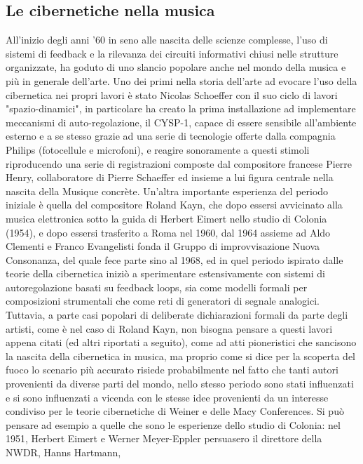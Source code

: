 \clearpage

\subsection{Le cibernetiche nella musica}
\label{sec:Le cibernetiche nella musica}
All'inizio degli anni '60 in seno alle nascita delle scienze complesse,
l'uso di sistemi di feedback e la rilevanza dei circuiti informativi chiusi
nelle strutture organizzate,
ha goduto di uno slancio popolare anche nel mondo della musica e più in generale dell'arte.
Uno dei primi nella storia dell'arte ad evocare l'uso della cibernetica nei propri lavori è stato
Nicolas Schoeffer con il suo ciclo di lavori "spazio-dinamici", in particolare ha creato
la prima installazione ad implementare meccanismi di auto-regolazione, il CYSP-1,
capace di essere sensibile all'ambiente esterno e a se stesso
grazie ad una serie di tecnologie offerte dalla compagnia Philips (fotocellule e microfoni),
e reagire sonoramente a questi stimoli riproducendo
una serie di registrazioni composte dal compositore francese Pierre Henry,
collaboratore di Pierre Schaeffer ed insieme a lui figura centrale nella nascita della Musique concrète.
Un'altra importante esperienza del periodo iniziale è quella del compositore Roland Kayn,
che dopo essersi avvicinato alla musica elettronica sotto la guida di Herbert Eimert
nello studio di Colonia (1954),
e dopo essersi trasferito a Roma nel 1960, dal 1964 assieme ad Aldo Clementi e Franco Evangelisti
fonda il Gruppo di improvvisazione Nuova Consonanza, del quale fece parte sino al 1968,
ed in quel periodo ispirato dalle teorie della cibernetica iniziò a sperimentare
estensivamente con sistemi di autoregolazione basati su feedback loops,
sia come modelli formali per composizioni strumentali che come reti di generatori di segnale analogici.
Tuttavia, a parte casi popolari di deliberate dichiarazioni formali da parte degli artisti,
come è nel caso di Roland Kayn,
non bisogna pensare a questi lavori appena citati (ed altri riportati a seguito),
come ad atti pioneristici che sancisono la nascita della cibernetica in musica,
ma proprio come si dice per la scoperta del fuoco
lo scenario più accurato risiede probabilmente nel fatto che
tanti autori provenienti da diverse parti del mondo, nello stesso periodo
sono stati influenzati e si sono influenzati a vicenda con le stesse idee
provenienti da un interesse condiviso per le teorie cibernetiche di Weiner e delle Macy Conferences.
Si può pensare ad esempio a quelle che sono le esperienze dello studio di Colonia:
nel 1951, Herbert Eimert e Werner Meyer-Eppler persuasero il direttore della NWDR, Hanns Hartmann,
